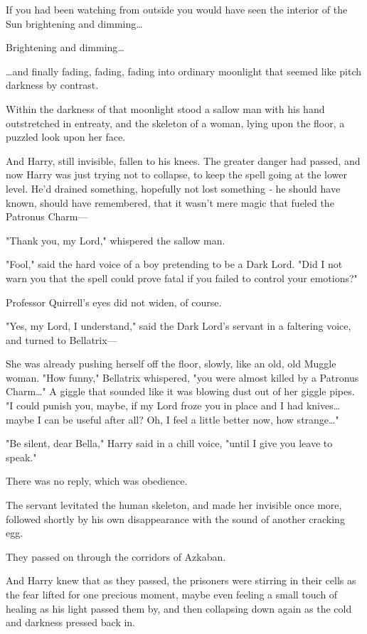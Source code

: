 If you had been watching from outside you would have seen the interior of the 
Sun brightening and dimming{\ldots}

Brightening and dimming{\ldots}

{\ldots}and finally fading, fading, fading into ordinary moonlight that seemed 
like pitch darkness by contrast.

Within the darkness of that moonlight stood a sallow man with his hand 
outstretched in entreaty, and the skeleton of a woman, lying upon the floor, a 
puzzled look upon her face.

And Harry, still invisible, fallen to his knees. The greater danger had passed, 
and now Harry was just trying not to collapse, to keep the spell going at the 
lower level. He'd drained something, hopefully not lost something \emph{-} he 
should have known, should have remembered, that it wasn't mere magic that 
fueled the Patronus Charm---

"Thank you, my Lord," whispered the sallow man.

"Fool," said the hard voice of a boy pretending to be a Dark Lord. "Did I not 
warn you that the spell could prove fatal if you failed to control your 
emotions?"

Professor Quirrell's eyes did not widen, of course.

"Yes, my Lord, I understand," said the Dark Lord's servant in a faltering 
voice, and turned to Bellatrix---

She was already pushing herself off the floor, slowly, like an old, old Muggle 
woman. "How funny," Bellatrix whispered, "you were almost killed by a Patronus 
Charm{\ldots}" A giggle that sounded like it was blowing dust out of her giggle 
pipes. "I could punish you, maybe, if my Lord froze you in place and I had 
knives{\ldots} maybe I can be useful after all? Oh, I feel a little better now, 
how strange{\ldots}"

"Be silent, dear Bella," Harry said in a chill voice, "until I give you leave 
to speak."

There was no reply, which was obedience.

The servant levitated the human skeleton, and made her invisible once more, 
followed shortly by his own disappearance with the sound of another cracking 
egg.

They passed on through the corridors of Azkaban.

And Harry knew that as they passed, the prisoners were stirring in their cells 
as the fear lifted for one precious moment, maybe even feeling a small touch of 
healing as his light passed them by, and then collapsing down again as the cold 
and darkness pressed back in.

